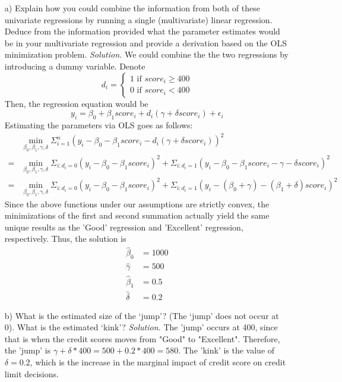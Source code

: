 \documentclass[
]{article}
\begin{document}
\begin{enumerate} 
\item[a)] Explain how you could combine the information from both of these univariate regressions by running a single (multivariate) linear regression. Deduce from the information provided what the parameter estimates would be in your multivariate regression and provide a derivation based on the OLS minimization problem.
\newline
\newline
\textit{Solution. }We could combine the the two regressions by introducing a dummy variable. Denote 
\[d_i = \begin{cases}1\text{ if $score_i \geq 400$} \\ 0\text{ if $score_i < 400$} \end{cases}\]
Then, the regression equation would be 
\[ y_i = \beta_0 + \beta_1 score_i + d_i(\gamma + \delta score_i) + \epsilon_i\]
Estimating the parameters via OLS goes as follows: 
\[\begin{aligned}
&\min_{\beta_0, \beta_1, \gamma, \delta} \Sigma_{i=1}^n(y_i-\beta_0 - \beta_1 score_i - d_i(\gamma + \delta score_i))^2 \\
=& \min_{\beta_0, \beta_1, \gamma, \delta} \Sigma_{i:d_i = 0}(y_i-\beta_0 - \beta_1 score_i)^2 + \Sigma_{i:d_i = 1}(y_i-\beta_0 - \beta_1 score_i - \gamma - \delta score_i)^2 \\
=& \min_{\beta_0, \beta_1, \gamma, \delta} \Sigma_{i:d_i = 0}(y_i-\beta_0 - \beta_1 score_i)^2 + \Sigma_{i:d_i = 1}(y_i-(\beta_0 + \gamma) - (\beta_1 + \delta) score_i )^2
\end{aligned}\]
Since the above functions under our assumptions are strictly convex, the minimizations of the first and second summation actually yield the same unique results as the 'Good' regression and 'Excellent' regression, respectively. Thus, the solution is 
\[\begin{aligned}
\hat\beta_0 &= 1000 \\
\hat\gamma &= 500 \\
\hat\beta_1 &= 0.5 \\
\hat\delta &= 0.2
\end{aligned}\]  

\item[b)] What is the estimated size of the ‘jump’? (The ‘jump’ does not occur at 0). What is the estimated ‘kink’?
\newline
\newline
\textit{Solution.} The 'jump' occurs at 400, since that is when the credit scores moves from "Good" to "Excellent". Therefore, the 'jump' is $\gamma + \delta * 400 = 500 + 0.2 * 400 = 580$. The 'kink' is the value of $\delta = 0.2$, which is the increase in the marginal impact of credit score on credit limit decisions.  


\end{enumerate}
\end{document}

